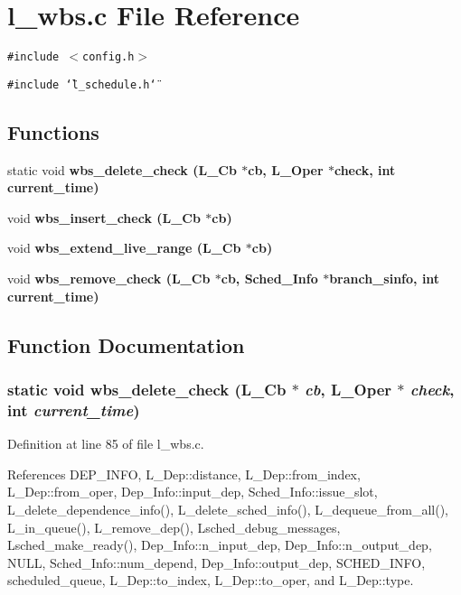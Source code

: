 \section{l\_\-wbs.c File Reference}
\label{l__wbs_8c}
{\tt \#include $<$config.h$>$}\par
{\tt \#include \char`\"{}l\_\-schedule.h\char`\"{}}\par
\subsection*{Functions}
\begin{CompactItemize}
\item 
static void \bf{wbs\_\-delete\_\-check} (L\_\-Cb $\ast$cb, L\_\-Oper $\ast$check, int \bf{current\_\-time})
\item 
void \bf{wbs\_\-insert\_\-check} (L\_\-Cb $\ast$cb)
\item 
void \bf{wbs\_\-extend\_\-live\_\-range} (L\_\-Cb $\ast$cb)
\item 
void \bf{wbs\_\-remove\_\-check} (L\_\-Cb $\ast$cb, \bf{Sched\_\-Info} $\ast$branch\_\-sinfo, int \bf{current\_\-time})
\end{CompactItemize}


\subsection{Function Documentation}
\subsubsection{\setlength{\rightskip}{0pt plus 5cm}static void wbs\_\-delete\_\-check (L\_\-Cb	$\ast$ {\em cb}, L\_\-Oper 	$\ast$ {\em check}, int {\em current\_\-time})\hspace{0.3cm}{\tt  [static]}}\label{l__wbs_8c_88163c730223406d6e9e493ea4f8c4b2}




Definition at line 85 of file l\_\-wbs.c.

References DEP\_\-INFO, L\_\-Dep::distance, L\_\-Dep::from\_\-index, L\_\-Dep::from\_\-oper, Dep\_\-Info::input\_\-dep, Sched\_\-Info::issue\_\-slot, L\_\-delete\_\-dependence\_\-info(), L\_\-delete\_\-sched\_\-info(), L\_\-dequeue\_\-from\_\-all(), L\_\-in\_\-queue(), L\_\-remove\_\-dep(), Lsched\_\-debug\_\-messages, Lsched\_\-make\_\-ready(), Dep\_\-Info::n\_\-input\_\-dep, Dep\_\-Info::n\_\-output\_\-dep, NULL, Sched\_\-Info::num\_\-depend, Dep\_\-Info::output\_\-dep, SCHED\_\-INFO, scheduled\_\-queue, L\_\-Dep::to\_\-index, L\_\-Dep::to\_\-oper, and L\_\-Dep::type.

